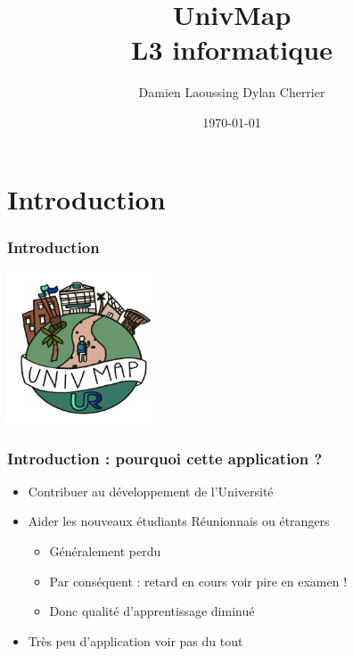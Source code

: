 \documentclass{beamer}
\title[Dev. Mobiles -- L3 info]{UnivMap\\L3 informatique}
\author{Damien Laoussing Dylan Cherrier}
\institute[DI]{Département d'informatique}
\date{\today}
\begin{document}
\begin{frame}
  \titlepage
\end{frame}


\section{Introduction}
%
%
\begin{frame}
  \frametitle{Introduction}
  \begin{center}
    \includegraphics[width=45mm, scale=0.5]{UnivMap-logo500x500.png}
  \end{center}
  
\end{frame}
%
%

\begin{frame}
  \frametitle{Introduction : pourquoi cette application ?}

  \begin{itemize}
    \item Contribuer au développement de l'Université
    \item Aider les nouveaux étudiants Réunionnais ou étrangers
    \begin{itemize}
      \item Généralement perdu
      \item Par conséquent : retard en cours voir pire en examen !
      \item Donc qualité d'apprentissage diminué
    \end{itemize}
    \item Très peu d'application voir pas du tout
  \end{itemize}
  
\end{frame}





%
%
\end{document}
